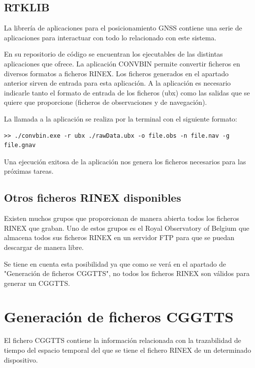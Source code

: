 \subsection{RTKLIB}
La librería de aplicaciones para el posicionamiento GNSS contiene una serie de aplicaciones para interactuar con todo lo relacionado con este sistema. \newline

En su repositorio de código \cite{reportklib} se encuentran los ejecutables de las distintas aplicaciones que ofrece. La aplicación CONVBIN permite convertir ficheros en diversos formatos a ficheros RINEX. Los ficheros generados en el apartado anterior sirven de entrada para esta aplicación. A la aplicación es necesario indicarle tanto el formato de entrada de los ficheros (ubx) como las salidas que se quiere que proporcione (ficheros de observaciones y de navegación).

La llamada a la aplicación se realiza por la terminal con el siguiente formato:

\begin{lstlisting}
>> ./convbin.exe -r ubx ./rawData.ubx -o file.obs -n file.nav -g file.gnav
\end{lstlisting}

Una ejecución exitosa de la aplicación nos genera los ficheros necesarios para las próximas tareas.

\subsection{Otros ficheros RINEX disponibles}
Existen muchos grupos que proporcionan de manera abierta todos los ficheros RINEX que graban. Uno de estos grupos es el Royal Observatory of Belgium que almacena todos sus ficheros RINEX en un servidor FTP \cite{ftprob} para que se puedan descargar de manera libre. \newline

Se tiene en cuenta esta posibilidad ya que como se verá en el apartado de "Generación de ficheros CGGTTS", no todos los ficheros RINEX son válidos para generar un CGGTTS.\newline


\section{Generación de ficheros CGGTTS}
El fichero CGGTTS contiene la información relacionada con la trazabilidad de tiempo del espacio temporal del que se tiene el fichero RINEX de un determinado dispositivo. \newline

